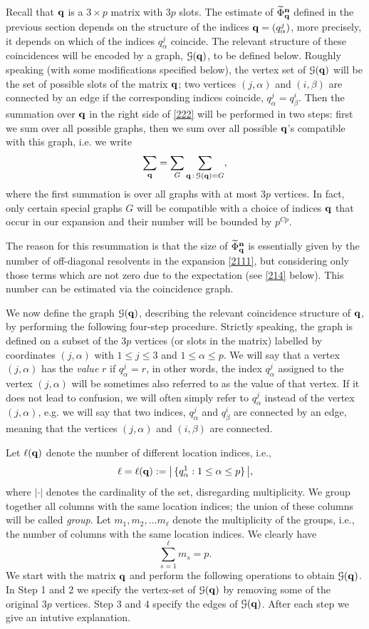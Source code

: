 \documentclass[draft]{article}
\newcommand{\wt}{\widetilde}
\newcommand{\bq}{{\bf {q}}}
\newcommand{\bn}{{\bf{n}}}
\newcommand{\al}{\alpha}
\newcommand{\be}{\begin{equation}}
\newcommand{\ee}{\end{equation}}
\newcommand{\cG}{{\mathcal G}}
\numberwithin{equation}{section}
\numberwithin{theorem}{section}
\numberwithin{definition}{section}
\numberwithin{remark}{section}
\begin{document}
Recall that  $\bq$ is a $3 \times p $ matrix
with $3p$ slots.
The  estimate of  $ \wt \Phi_{\bq}^{\bf n}$ defined
in the previous section depends on the structure 
of the indices $\bq = (q_\al^j)$, more precisely, it depends on which of
the indices $q_\al^j$ coincide. The relevant structure of
these coincidences will be encoded by a graph, $\cG(\bq)$, to be 
defined below. 
Roughly speaking (with some modifications specified below),
 the vertex set of  $\cG(\bq)$ 
will be the set of possible slots of the matrix $\bq$;
 two vertices $(j,\al)$ and $(i,\beta)$
are connected by an edge if the
corresponding indices coincide, $q_\al^j =q_\beta^i$.
Then the summation over $\bq$ in the right side of
 \eqref{222} will be performed 
in two steps: first we sum over all possible graphs, then 
we sum over all possible $\bq$'s compatible with this graph, i.e. we
write
\be\label{fubini} 
  \sum_\bq = \sum_{G} \sum_{\bq\, : \, \cG(\bq) = G},
\ee
where the first summation is over all graphs with at most $3p$ vertices.
In fact, only certain special graphs $G$ will be compatible
with a choice of indices $\bq$ that occur 
in our expansion and their number will be bounded by
$p^{Cp}$.

The reason for this resummation is that the
size of $\wt\Phi_\bq^\bn$ is essentially given 
by the number of off-diagonal resolvents  in the expansion \eqref{2111},
but considering only those terms which are not zero due to
the expectation (see \eqref{214} below). This number
can be estimated via the coincidence graph.

We now define the graph $\cG(\bq)$, describing the relevant coincidence
structure of $\bq$, by  performing the following four-step procedure.
Strictly speaking, the graph is defined on a subset of the $3p$
vertices (or slots in the matrix) labelled  by  
coordinates $(j, \alpha)$ with $1\le j \le 3$ and $1 \le \alpha \le p$.
We will say that a vertex $(j, \alpha)$  has the {\it value} 
$r$ if $q^j_\alpha = r$, in other words, the index $q^j_\al$ assigned
to the vertex  $(j, \alpha)$ will be sometimes also referred to
as the value of that vertex.  
 If it does not
lead to confusion,   we will often simply refer to $q^j_\alpha$ 
instead of the vertex $(j,\al)$, e.g. we will
 say that two indices,  $q^j_\alpha$
and $q_\beta^i$ are connected by an edge, meaning that the vertices $(j,\al)$
and $(i,\beta)$ are connected.


Let   $\ell (\bq)$ denote the number of different location indices, i.e., 
\be\label{elldef}
\ell=\ell(\bq) : = \big| \,   \{ q^1_\alpha:  1 \le \alpha \le p\} \, \big|,
\ee  
where $| \cdot|$ denotes the cardinality of the set, disregarding
multiplicity.
We group together all columns  with the same location indices;
the union of these columns will be called {\it group}.
Let $m_1, m_2, \ldots m_\ell$ denote the multiplicity of the groups, 
i.e., the number of columns with the same location indices. We clearly have
\be
   \sum_{s=1}^\ell m_s = p.
\label{msum}
\ee
We start with the matrix $\bq$ and perform the following operations
to obtain $\cG(\bq)$. In Step 1 and 2 we specify the vertex-set
of $\cG(\bq)$ by removing some of 
the original $3p$ vertices.
Step 3 and 4 specify the edges of $\cG(\bq)$.  After each step
we give an intutive explanation.
\end{document}
